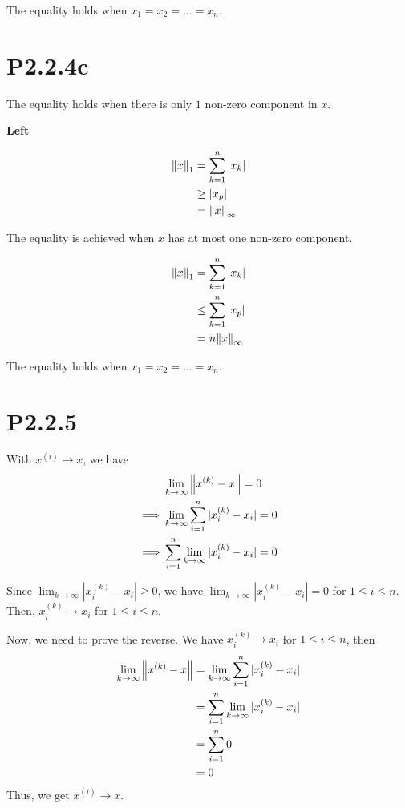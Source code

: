 \documentclass{article}
\begin{document}
The equality holds when $x_1=x_2=\dots=x_n$.

\section*{P2.2.4c}

The equality holds when there is only $1$ non-zero component in $x$.

\textbf{Left}

\begin{align*}
    \norm{x}_1 & = \sum_{k=1}^n |x_k| \\
               & \ge |x_p|            \\
               & = \norm{x}_\infty
\end{align*}

The equality is achieved when $x$ has at most one non-zero component.


\begin{align*}
    \norm{x}_1 & = \sum_{k=1}^n |x_k|   \\
               & \le \sum_{k=1}^n |x_p| \\
               & =n \norm{x}_\infty
\end{align*}

The equality holds when $x_1=x_2=\dots=x_n$.

\section*{P2.2.5}
With $x^{(i)}\to x$, we have
\begin{align*}
             & \lim_{k\to\infty}\norm{x^{(k)}-x}=0               \\
    \implies & \lim_{k\to\infty}\sum_{i=1}^n |x^{(k)}_i-x_i| = 0 \\
    \implies & \sum_{i=1}^n \lim_{k\to\infty}|x^{(k)}_i-x_i| = 0
\end{align*}

Since $\lim_{k\to\infty}|x^{(k)}_i-x_i|\ge 0$, we have $\lim_{k\to\infty}|x^{(k)}_i-x_i|=0$ for $1\le i \le n$.
Then, $x^{(k)}_i \to x_i$ for $1\le i \le n$.

Now, we need to prove the reverse. We have $x^{(k)}_i \to x_i$ for $1\le i \le n$,
then
\begin{align*}
    \lim_{k\to\infty}\norm{x^{(k)}-x}
     & = \lim_{k\to\infty}\sum_{i=1}^n |x^{(k)}_i-x_i| \\
     & =\sum_{i=1}^n \lim_{k\to\infty}|x^{(k)}_i-x_i|  \\
     & = \sum_{i=1}^n 0                                \\
     & = 0
\end{align*}
Thus, we get $x^{(i)}\to x$.
\end{document}
